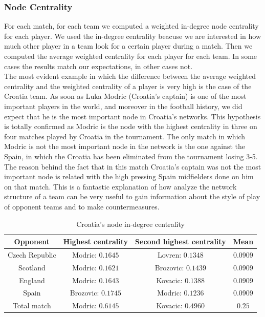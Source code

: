 \documentclass[12pt, a4paper]{article}
\begin{document}
\subsubsection{Node Centrality}
For each match, for each team we computed a weighted in-degree node centrality for each player. We used the in-degree centrality beacuse we are interested in how much other player in a team look for a certain player during a match. Then we computed the average weighted centrality for each player for each team. In some cases the results match our expectations, in other cases not. \\
The most evident example in which the difference between the average weighted centrality and the weighted centrality of a player is very high is the case of the Croatia team. As soon as Luka Modric (Croatia's captain) is one of the most important players in the world, and moreover in the football history, we did expect that he is the most important node in Croatia's networks. This hypothesis is totally confirmed as Modric is the node with the highest centrality in three on four matches played by Croatia in the tournament. The only match in which Modric is not the most important node in the network is the one against the Spain, in which the Croatia has been eliminated from the tournament losing 3-5. The reason behind the fact that in this match Croatia's captain was not the most important node is related with the high pressing Spain midfielders done on him on that match. This is a fantastic explanation of how analyze the network structure of a team can be very useful to gain information about the style of play of opponent teams and to make countermeasures.  \\ 

\begin{table}[H]
    \centering
    \begin{tabular}{|c|c|c|c|}
            \hline
           Opponent & Highest centrality & Second highest centrality & Mean \\
            \hline
            Czech Republic &  Modric: $0.1645$ & Lovren: $0.1348$ & $0.0909$ \\
            \hline
            Scotland &  Modric: $0.1621$ & Brozovic: $0.1439$ & $0.0909$ \\
            \hline
            England &  Modric: $0.1643$ & Kovacic: $0.1388$ & $0.0909$ \\
            \hline
            Spain &  Brozovic: $0.1745$ & Modric: $0.1236$ & $0.0909$ \\
            \hline
            Total match &  Modric: $0.6145$ & Kovacic: $0.4960$ & $0.25$ \\
            \hline
    \end{tabular}
    \caption{Croatia's node in-degree centrality}
\end{table}
\end{document}
